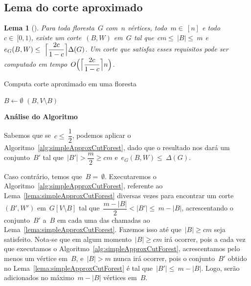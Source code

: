 \documentclass[a4paper,12pt]{article}
\DeclarePairedDelimiter\ceil{\lceil}{\rceil}
\newtheorem{lem}{Lema}
\begin{document}
\subsection{Lema do corte aproximado}

\begin{lem}[{\cite[Lemma 3]{Schmidt15}}]
\label{lema:approxCutForest}
	Para toda floresta~$G$ com~$n$ vértices, todo~$m \in~[n]$ e 
	todo~$c \in~[0,1)$, existe um corte~$(B,W)$ em~$G$ tal 
	que~$cm \le~|B| \le~m$ 
	e~$e_G(B,W) \le~\ceil[\Big]{ \dfrac{2c}{1-c}} \Delta(G)$.
	Um corte que satisfaz esses requisitos pode ser computado em
	tempo~$O\Big(\ceil[\Big]{ \dfrac{2c}{1-c}} n\Big)$.
\end{lem}

\medskip
\medskip

\begin{algorithm}[H]
\label{alg:approxCutForest}

	\caption{Computa corte aproximado em uma floresta}
	{
		$B \gets \emptyset$\;
	}
	\Return $(B,V\setminus B)$

\end{algorithm}	

\bigskip
\bigskip
\bigskip

\textbf{Análise do Algoritmo}

	Sabemos que se~$c \le~\dfrac{1}{2}$, podemos aplicar o 
	Algoritmo~\ref{alg:simpleApproxCutForest}, dado que o 
	resultado nos dará um conjunto~$B'$ tal 
	que~$|B'|>\dfrac{m}{2}\ge cm$ e~$e_G(B,W)\le~\Delta(G)$.

	Caso contrário, temos que~$B =~\emptyset$.
	Executaremos o Algoritmo~\ref{alg:simpleApproxCutForest}, 
	referente ao Lema~\ref{lema:simpleApproxCutForest} diversas 
	vezes para encontrar um corte~$(B',W')$ em~$G[V\setminus B]$ 
	tal que~$\dfrac{m-|B|}{2}<|B'|\le~m-|B|$, acrescentando o 
	conjunto~$B'$ a~$B$ em cada uma das chamadas ao 
	Lema~\ref{lema:simpleApproxCutForest}.
	Fazemos isso até que~$|B|\ge cm$ seja satisfeito.
	Nota-se que em algum momento~$|B|\ge cm$ irá ocorrer, pois a 
	cada vez que executamos o 
	Algoritmo~\ref{alg:simpleApproxCutForest}, acrescentamos pelo 
	menos um vértice em~$B$, e~$|B|>m$ nunca irá ocorrer, pois o 
	conjunto~$B'$ obtido no Lema~\ref{lema:simpleApproxCutForest} 
	é tal que~$|B'|\le~m-|B|$. Logo, serão adicionados no 
	máximo~$m-|B|$ vértices em~$B$.
\end{document}
